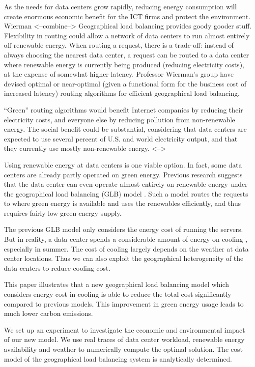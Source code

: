 \documentclass{acm_proc_article-sp}
\begin{document}
As the needs for data centers grow rapidly, reducing energy consumption
will create enormous economic benefit for the ICT firms and protect the environment.
Wierman
<--combine-->
Geographical load balancing provides goody gooder stuff. Flexibility in routing could allow a network of data centers to run almost entirely off renewable energy. When routing a request, there is a trade-off: instead of always choosing the nearest data center, a request can be routed to a data center where renewable energy is currently being produced (reducing electricity costs), at the expense of somewhat higher latency. Professor Wierman’s group have devised optimal or near-optimal (given a functional form for the business cost of increased latency) routing algorithms for efficient geographical load balancing.

“Green” routing algorithms would benefit Internet companies by reducing their electricity costs, and everyone else by reducing pollution from non-renewable energy. The social benefit could be substantial, considering that data centers are expected to use several percent of U.S. and world electricity output, and that they currently use mostly non-renewable energy.
<-->

Using renewable energy at data centers is one viable option. In fact, some data centers are already partly operated on green energy. Previous research suggests that the data center can even operate almost entirely on renewable energy under the geographical load balancing (GLB) model \cite{adam:GLB}. Such a model routes the requests to where green energy is available and uses the renewables efficiently, and thus requires fairly low green energy supply. 

The previous GLB model only considers the energy cost of running the servers. But in reality, a data center spends a considerable amount of energy on cooling \cite{datacenter}, especially in summer. The cost of cooling largely depends on the weather at data center locations. Thus we can also exploit the geographical heterogeneity of the data centers to reduce cooling cost.

This paper illustrates that a new geographical load balancing model which considers energy cost in cooling is able to reduce the total cost significantly compared to previous models. This improvement in green energy usage leads to much lower carbon emissions.

We set up an experiment to investigate the economic and environmental impact of our new model. We use real traces of data center workload, renewable energy availability and weather to numerically compute the optimal solution. The cost model of the geographical load balancing system is analytically determined. 
\end{document}
